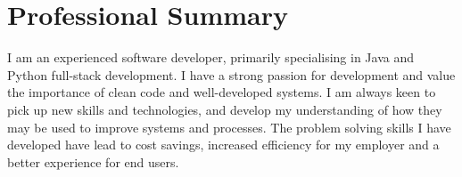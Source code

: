 \section{Professional Summary}

I am an experienced software developer, primarily specialising in Java and Python full-stack development. 
I have a strong passion for development and value the importance of clean code and well-developed systems. 
I am always keen to pick up new skills and technologies, and develop my understanding of how they may be used to improve systems and processes.
The problem solving skills I have developed have lead to cost savings, increased efficiency for my employer and a better experience for end users.